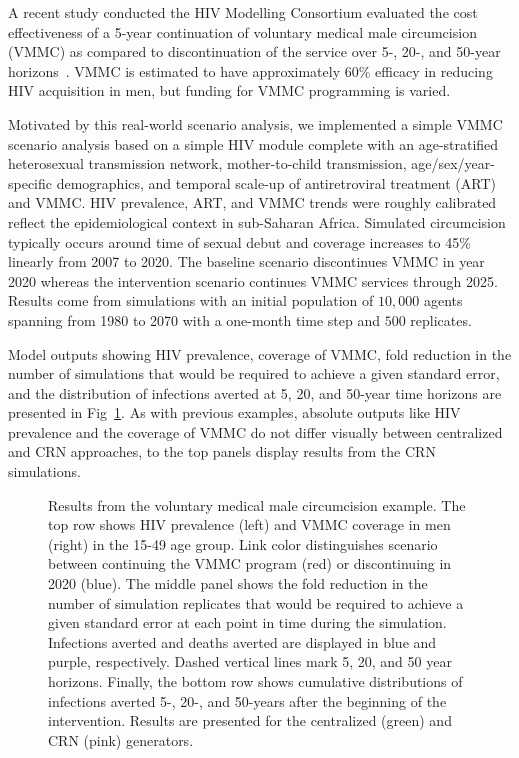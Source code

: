 \documentclass[10pt,letterpaper]{article}
\begin{document}
A recent study conducted the HIV Modelling Consortium evaluated the cost effectiveness of a 5-year continuation of voluntary medical male circumcision (VMMC) as compared to discontinuation of the service over 5-, 20-, and 50-year horizons~\cite{bansi2023cost}. VMMC is estimated to have approximately 60\% efficacy in reducing HIV acquisition in men, but funding for VMMC programming is varied.
 
Motivated by this real-world scenario analysis, we implemented a simple VMMC scenario analysis based on a simple HIV module complete with an age-stratified heterosexual transmission network, mother-to-child transmission, age/sex/year-specific demographics, and temporal scale-up of antiretroviral treatment (ART) and VMMC. HIV prevalence, ART, and VMMC trends were roughly calibrated reflect the epidemiological context in sub-Saharan Africa. Simulated circumcision typically occurs around time of sexual debut and coverage increases to 45\% linearly from 2007 to 2020. The baseline scenario discontinues VMMC in year 2020 whereas the intervention scenario continues VMMC services through 2025. Results come from simulations with an initial population of $10,000$ agents spanning from 1980 to 2070 with a one-month time step and $500$ replicates.

Model outputs showing HIV prevalence, coverage of VMMC, fold reduction in the number of simulations that would be required to achieve a given standard error, and the distribution of infections averted at 5, 20, and 50-year time horizons are presented in Fig~\ref{f:hiv_ts}. As with previous examples, absolute outputs like HIV prevalence and the coverage of VMMC do not differ visually between centralized and CRN approaches, to the top panels display results from the CRN simulations.

\begin{figure}[h]%
\centering
\caption{Results from the voluntary medical male circumcision example. The top row shows HIV prevalence (left) and VMMC coverage in men (right) in the 15-49 age group. Link color distinguishes scenario between continuing the VMMC program (red) or discontinuing in 2020 (blue). The middle panel shows the fold reduction in the number of simulation replicates that would be required to achieve a given standard error at each point in time during the simulation. Infections averted and deaths averted are displayed in blue and purple, respectively. Dashed vertical lines mark 5, 20, and 50 year horizons. Finally, the bottom row shows cumulative distributions of infections averted 5-, 20-, and 50-years after the beginning of the intervention. Results are presented for the centralized (green) and CRN (pink) generators. }
\label{f:hiv_ts}
\end{figure}
\end{document}
